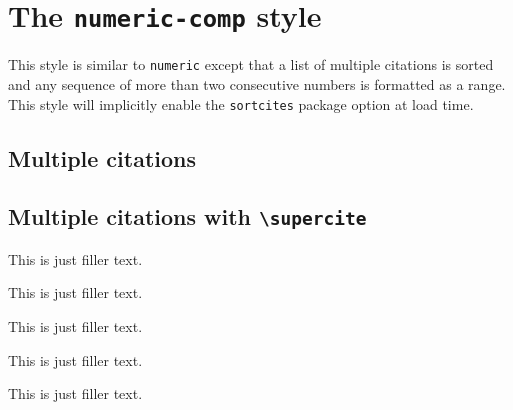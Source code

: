 \documentclass[a4paper]{article}
\newcommand{\cmd}[1]{\texttt{\textbackslash #1}}
\begin{document}
\section*{The \texttt{numeric-comp} style}

This style is similar to \texttt{numeric} except that a list of
multiple citations is sorted and any sequence of more than two
consecutive numbers is formatted as a range. This style will
implicitly enable the \texttt{sortcites} package option at load
time.

\subsection*{Multiple citations}

\cite{bertram,augustine}

\cite{murray,bertram,augustine,companion,cotton}

\cite{augustine,bertram,cotton,hammond,set,massa,murray}

\cite{bertram,companion,cotton,augustine,massa,set,hammond,murray,stdmodel}

\cite{yoon,weinberg}

\subsection*{Multiple citations with \cmd{supercite}}

This is just filler text.\supercite{bertram,augustine}

This is just filler text.\supercite{murray,bertram,augustine,companion,cotton}

This is just filler text.\supercite{augustine,bertram,cotton,hammond,set,massa,murray}

This is just filler text.\supercite{bertram,companion,cotton,augustine,massa,set,hammond,murray,stdmodel}

This is just filler text.\supercite{yoon,weinberg}

\clearpage
\printbibliography
\end{document}
